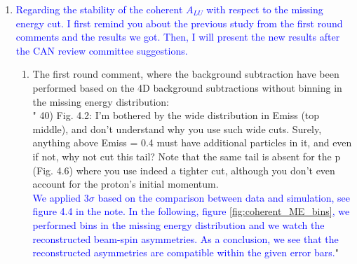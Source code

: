 \begin{enumerate}
   \item \textcolor{blue}{Regarding the stability of the coherent $A_{LU}$ with 
      respect to the missing energy cut. I first remind you about the previous 
   study from the first round comments and the results we got. Then, I will 
present the new results after the CAN review committee suggestions. }
   
\begin{enumerate}
   \item The first round comment, where the background subtraction have been 
      performed based on the 4D background subtractions without binning in the 
      missing energy distribution: \\
      " 40) Fig.  4.2: I'm bothered by the wide distribution in Emiss (top 
      middle), and don't understand why you use such wide cuts.  Surely, 
      anything above Emiss = 0.4 must have additional particles in it, and even 
      if not, why not cut this tail?  Note that the same tail is absent for the 
      p (Fig. 4.6) where you use indeed a tighter cut, although you don't even 
      account for the proton's initial momentum.\\
   \textcolor{blue}{ We applied 3$\sigma$ based on the comparison between data 
      and simulation, see figure 4.4 in the note. In the following, figure 
      \ref{fig:coherent_ME_bins}, we performed bins in the missing energy 
      distribution and we watch the reconstructed beam-spin asymmetries. As a 
      conclusion, we see that the reconstructed asymmetries are compatible 
   within the given error bars.}" \\


\end{enumerate}
\end{enumerate}
